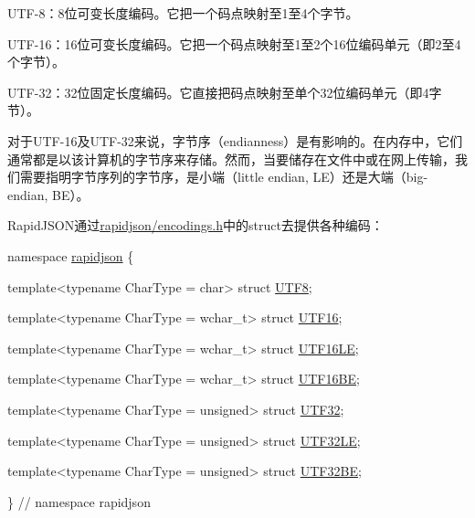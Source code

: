 \begin{DoxyItemize}
\item U\+T\+F-\/8：8位可变长度编码。它把一个码点映射至1至4个字节。
\item U\+T\+F-\/16：16位可变长度编码。它把一个码点映射至1至2个16位编码单元（即2至4个字节）。
\item U\+T\+F-\/32：32位固定长度编码。它直接把码点映射至单个32位编码单元（即4字节）。
\end{DoxyItemize}

对于\+U\+T\+F-\/16及\+U\+T\+F-\/32来说，字节序（endianness）是有影响的。在内存中，它们通常都是以该计算机的字节序来存储。然而，当要储存在文件中或在网上传输，我们需要指明字节序列的字节序，是小端（little endian, L\+E）还是大端（big-\/endian, B\+E）。

Rapid\+J\+S\+O\+N通过{\ttfamily \hyperlink{encodings_8h_source}{rapidjson/encodings.\+h}}中的struct去提供各种编码：


\begin{DoxyCode}
\textcolor{keyword}{namespace }\hyperlink{namespacerapidjson}{rapidjson} \{

\textcolor{keyword}{template}<\textcolor{keyword}{typename} CharType = \textcolor{keywordtype}{char}>
\textcolor{keyword}{struct }\hyperlink{struct_u_t_f8}{UTF8};

\textcolor{keyword}{template}<\textcolor{keyword}{typename} CharType = \textcolor{keywordtype}{wchar\_t}>
\textcolor{keyword}{struct }\hyperlink{struct_u_t_f16}{UTF16};

\textcolor{keyword}{template}<\textcolor{keyword}{typename} CharType = \textcolor{keywordtype}{wchar\_t}>
\textcolor{keyword}{struct }\hyperlink{struct_u_t_f16_l_e}{UTF16LE};

\textcolor{keyword}{template}<\textcolor{keyword}{typename} CharType = \textcolor{keywordtype}{wchar\_t}>
\textcolor{keyword}{struct }\hyperlink{struct_u_t_f16_b_e}{UTF16BE};

\textcolor{keyword}{template}<\textcolor{keyword}{typename} CharType = \textcolor{keywordtype}{unsigned}>
\textcolor{keyword}{struct }\hyperlink{struct_u_t_f32}{UTF32};

\textcolor{keyword}{template}<\textcolor{keyword}{typename} CharType = \textcolor{keywordtype}{unsigned}>
\textcolor{keyword}{struct }\hyperlink{struct_u_t_f32_l_e}{UTF32LE};

\textcolor{keyword}{template}<\textcolor{keyword}{typename} CharType = \textcolor{keywordtype}{unsigned}>
\textcolor{keyword}{struct }\hyperlink{struct_u_t_f32_b_e}{UTF32BE};

\} \textcolor{comment}{// namespace rapidjson}
\end{DoxyCode}


